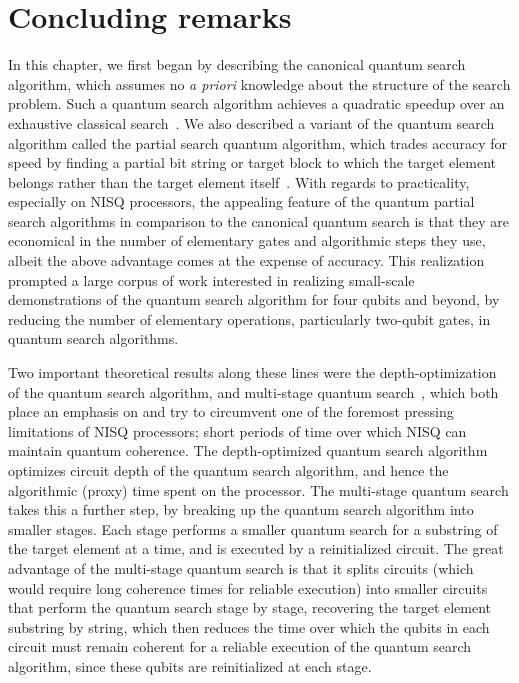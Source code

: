 \section{Concluding remarks}

\noindent
 In this chapter, we first began by describing the canonical quantum search algorithm, which assumes no \emph{a priori} knowledge about the structure of the search problem. Such a quantum search algorithm achieves a quadratic speedup over an exhaustive classical search~\cite{Grover_1997}. We also described a variant of the quantum search algorithm called the partial search quantum algorithm, which trades accuracy for speed by finding a partial bit string or target block to which the target element belongs rather than the target element itself~\cite{Grover_2005}. With regards to practicality, especially on \acs{NISQ} processors, the appealing feature of the quantum partial search algorithms in comparison to the canonical quantum search is that they are economical in the number of elementary gates and algorithmic steps they use, albeit the above advantage comes at the expense of accuracy. This realization prompted a large corpus of work interested in realizing small-scale demonstrations of the quantum search algorithm for four qubits and beyond, by reducing the number of elementary operations, particularly two-qubit gates, in quantum search algorithms.

 \bigskip
 \noindent
 Two important theoretical results along these lines were the depth-optimization of the quantum search algorithm, and multi-stage quantum search~\cite{Zhang_2020}, which both place an emphasis on and try to circumvent one of the foremost pressing limitations of \acs{NISQ} processors; short periods of time over which \acs{NISQ} can maintain quantum coherence. The depth-optimized quantum search algorithm optimizes circuit depth of the quantum search algorithm, and hence the algorithmic (proxy) time spent on the processor. The multi-stage quantum search takes this a further step, by breaking up the quantum search algorithm into smaller stages. Each stage performs a smaller quantum search for a substring of the target element at a time, and is executed by a reinitialized circuit. The great advantage of the multi-stage quantum search is that it splits circuits (which would require long coherence times for reliable execution) into smaller circuits that perform the quantum search stage by stage, recovering the target element substring by string, which then reduces the time over which the qubits in each circuit must remain coherent for a reliable execution of the quantum search algorithm, since these qubits are reinitialized at each stage.


